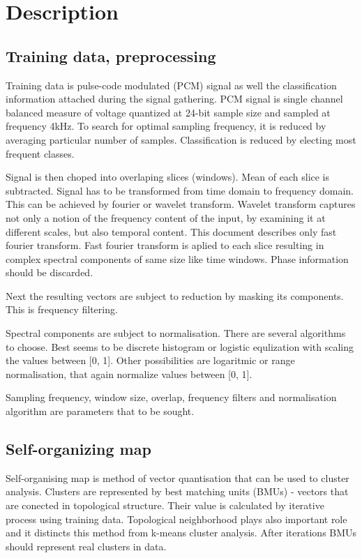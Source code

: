 \documentclass[a4paper]{IEEEtran}
\begin{document}

\section{Description}
\subsection{Training data, preprocessing}
Training data is pulse-code modulated (PCM) signal as well the classification 
information attached during the signal gathering.
PCM signal is single channel balanced measure of voltage
quantized at 24-bit sample size
and sampled at frequency 4kHz. To search for optimal sampling frequency,
it is reduced by averaging particular number of samples. Classification
is reduced by electing most frequent classes.

Signal is then choped into overlaping slices (windows).
Mean of each slice is subtracted.
Signal has to be transformed from time domain to frequency domain.
This can be achieved by fourier or wavelet transform.
Wavelet transform captures not only a notion of the frequency content of the input,
by examining it at different scales, but also temporal content.
This document describes only fast fourier transform.
Fast fourier transform is aplied to each slice resulting in
complex spectral components of same size like time windows.
Phase information should be discarded.

Next the resulting vectors are subject to reduction by masking its components.
This is frequency filtering.

Spectral components are subject to normalisation.
There are several algorithms to choose. Best seems to be 
discrete histogram or logistic equlization with scaling the values between [0, 1].
Other possibilities are logaritmic or range normalisation, that again normalize
values between [0, 1].

Sampling frequency, window size, overlap, frequency filters and normalisation algorithm 
are parameters that to be sought.

\subsection{Self-organizing map}
Self-organising map is method of vector quantisation that can be used to 
cluster analysis. Clusters are represented by best matching units (BMUs)
- vectors that are conected in topological structure. Their value is calculated
by iterative process using training data. Topological neighborhood plays 
also important role and it distincts this method from k-means cluster analysis.
After iterations BMUs should represent real clusters in data.
\end{document}
